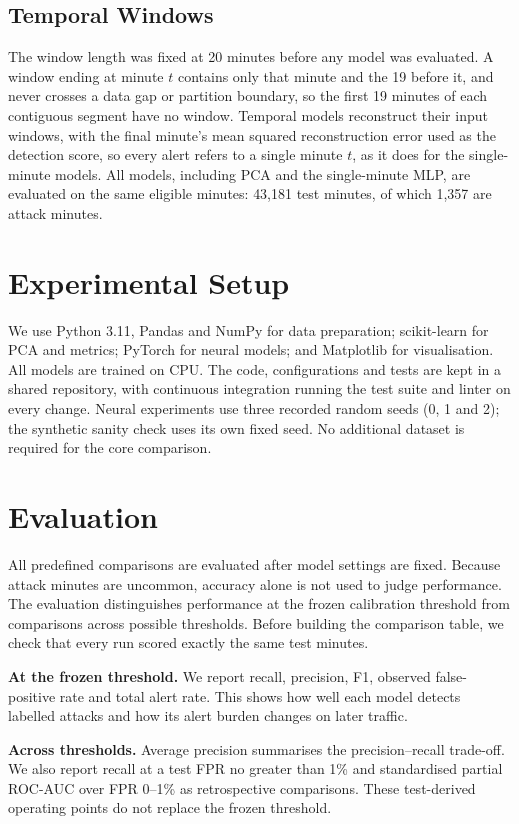 \documentclass[conference]{IEEEtran}
\begin{document}
\subsection{Temporal Windows}
The window length was fixed at 20 minutes before any model was evaluated. A window ending at minute $t$ contains only that minute and the 19 before it, and never crosses a data gap or partition boundary, so the first 19 minutes of each contiguous segment have no window. Temporal models reconstruct their input windows, with the final minute's mean squared reconstruction error used as the detection score, so every alert refers to a single minute $t$, as it does for the single-minute models. All models, including PCA and the single-minute MLP, are evaluated on the same eligible minutes: 43,181 test minutes, of which 1,357 are attack minutes.

\section{Experimental Setup}
We use Python 3.11, Pandas and NumPy for data preparation; scikit-learn for PCA and metrics; PyTorch for neural models; and Matplotlib for visualisation. All models are trained on CPU. The code, configurations and tests are kept in a shared repository, with continuous integration running the test suite and linter on every change. Neural experiments use three recorded random seeds (0, 1 and 2); the synthetic sanity check uses its own fixed seed. No additional dataset is required for the core comparison.

\section{Evaluation}
All predefined comparisons are evaluated after model settings are fixed. Because attack minutes are uncommon, accuracy alone is not used to judge performance. The evaluation distinguishes performance at the frozen calibration threshold from comparisons across possible thresholds. Before building the comparison table, we check that every run scored exactly the same test minutes.

\textbf{At the frozen threshold.} We report recall, precision, F1, observed false-positive rate and total alert rate. This shows how well each model detects labelled attacks and how its alert burden changes on later traffic.

\textbf{Across thresholds.} Average precision summarises the precision--recall trade-off. We also report recall at a test FPR no greater than 1\% and standardised partial ROC-AUC over FPR 0--1\% as retrospective comparisons. These test-derived operating points do not replace the frozen threshold.
\end{document}
